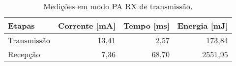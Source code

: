 \begin{table}
\centering
\caption{Medições em modo PA RX de transmissão.}
\label{tab:PA_RX}
\begin{tabular}{lrrr}
\toprule
     Etapas &  Corrente [mA] &  Tempo [ms] &  Energia [mJ] \\
\midrule
Transmissão &          13,41 &        2,57 &        173,84 \\
   Recepção &           7,36 &       68,70 &       2551,95 \\
\bottomrule
\end{tabular}
\end{table}
